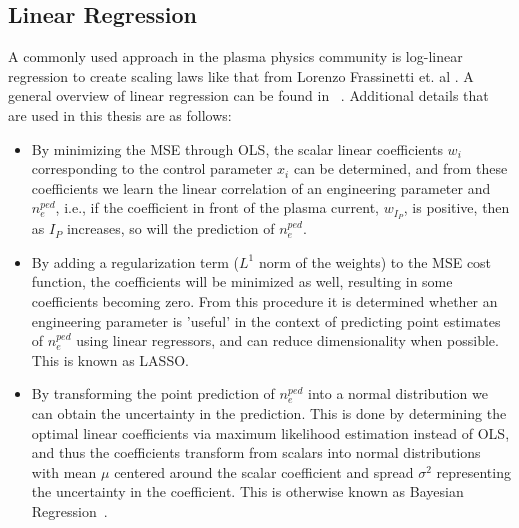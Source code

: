 \documentclass[a4paper, twoside, final, 12pt]{article}
\begin{document}
\subsection{Linear Regression}
A commonly used approach in the plasma physics community is log-linear regression to create scaling laws like that from Lorenzo Frassinetti et. al \cite{Frassinetti_2020}.
A general overview of linear regression can be found in ~\cite{hastie01statisticallearning}. 
Additional details that are used in this thesis are as follows: 
\begin{itemize}
	\item By minimizing the MSE through OLS, the scalar linear coefficients $w_i$ corresponding to the control parameter $x_i$ can be determined, and from these coefficients we learn the linear correlation of an engineering parameter and $n_e^{ped}$, i.e., if the coefficient in front of the plasma current, $w_{I_P}$, is positive, then as $I_P$ increases, so will the prediction of $n_e^{ped}$.
	\item By adding a regularization term ($L^1$ norm of the weights) to the MSE cost function, the coefficients will be minimized as well, resulting in some coefficients becoming zero. From this procedure it is determined whether an engineering parameter is 'useful' in the context of predicting point estimates of $n_e^{ped}$ using linear regressors, and can reduce dimensionality when possible. This is known as LASSO. \cite{Bisong2019, LASSO_OG, LASSO_COIN}
	\item By transforming the point prediction of $n_e^{ped}$  into a normal distribution we can obtain the uncertainty in the prediction. This is done by determining the optimal linear coefficients via maximum likelihood estimation instead of OLS, and thus the coefficients transform from scalars into normal distributions with mean $\mu$ centered around the scalar coefficient and spread $\sigma^2$ representing the uncertainty in the coefficient. This is otherwise known as Bayesian Regression~\cite{bayes_regr}.
\end{itemize}
\end{document}
